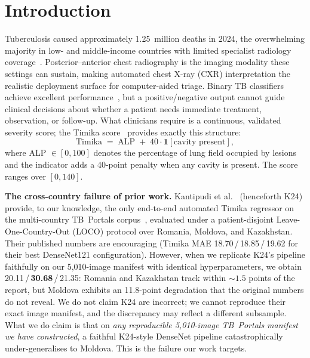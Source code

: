\documentclass[runningheads]{llncs}
\begin{document}
\section{Introduction}

Tuberculosis caused approximately 1.25~million deaths in 2024, the overwhelming majority in low- and middle-income countries with limited specialist radiology coverage~\cite{who2024tb}. Posterior--anterior chest radiography is the imaging modality these settings can sustain, making automated chest X-ray (CXR) interpretation the realistic deployment surface for computer-aided triage. Binary TB classifiers achieve excellent performance~\cite{liu2020tbx11k}, but a positive/negative output cannot guide clinical decisions about whether a patient needs immediate treatment, observation, or follow-up. What clinicians require is a continuous, validated severity score; the Timika score~\cite{ralph2010timika} provides exactly this structure:
\begin{equation}
\text{Timika} \;=\; \mathrm{ALP} \;+\; 40 \cdot \mathbf{1}[\text{cavity present}],
\label{eq:timika}
\end{equation}
where ALP $\in [0,100]$ denotes the percentage of lung field occupied by lesions and the indicator adds a 40-point penalty when any cavity is present. The score ranges over $[0,140]$.

\smallskip\noindent\textbf{The cross-country failure of prior work.}
Kantipudi et al.~\cite{kantipudi2024} (henceforth K24) provide, to our knowledge, the only end-to-end automated Timika regressor on the multi-country TB~Portals corpus~\cite{tbportals2020}, evaluated under a patient-disjoint Leave-One-Country-Out (LOCO) protocol over Romania, Moldova, and Kazakhstan. Their published numbers are encouraging (Timika MAE 18.70\,/\,18.85\,/\,19.62 for their best DenseNet121 configuration). However, when we replicate K24's pipeline faithfully on our 5{,}010-image manifest with identical hyperparameters, we obtain 20.11\,/\,\textbf{30.68}\,/\,21.35: Romania and Kazakhstan track within $\sim 1.5$ points of the report, but Moldova exhibits an 11.8-point degradation that the original numbers do not reveal. We do not claim K24 are incorrect; we cannot reproduce their exact image manifest, and the discrepancy may reflect a different subsample. What we do claim is that on \emph{any reproducible 5{,}010-image TB~Portals manifest we have constructed}, a faithful K24-style DenseNet pipeline catastrophically under-generalises to Moldova. This is the failure our work targets.
\end{document}
